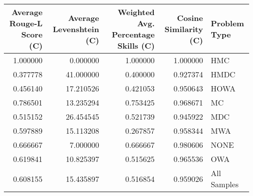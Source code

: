 \begin{tabular}{rrrrl}
\toprule
Average Rouge-L Score (C) & Average Levenshtein (C) & Weighted Avg. Percentage Skills (C) & Cosine Similarity (C) & Problem Type \\
\midrule
1.000000 & 0.000000 & 1.000000 & 1.000000 & HMC \\
0.377778 & 41.000000 & 0.400000 & 0.927374 & HMDC \\
0.456140 & 17.210526 & 0.421053 & 0.950643 & HOWA \\
0.786501 & 13.235294 & 0.753425 & 0.968671 & MC \\
0.515152 & 26.454545 & 0.521739 & 0.945922 & MDC \\
0.597889 & 15.113208 & 0.267857 & 0.958344 & MWA \\
0.666667 & 7.000000 & 0.666667 & 0.980606 & NONE \\
0.619841 & 10.825397 & 0.515625 & 0.965536 & OWA \\
0.608155 & 15.435897 & 0.516854 & 0.959026 & All Samples \\
\bottomrule
\end{tabular}
